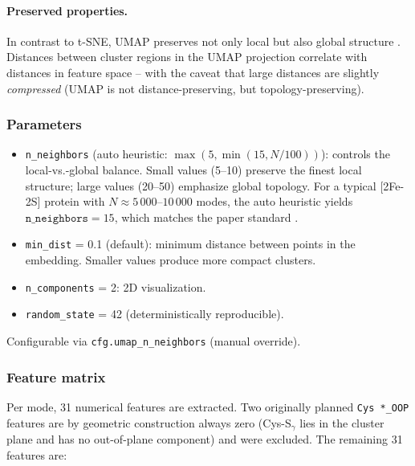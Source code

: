 \documentclass[11pt,a4paper,twoside]{article}
\theoremstyle{remark}
\begin{document}
\paragraph{Preserved properties.}

In contrast to t-SNE, UMAP preserves not only local but also global
structure \cite{Becht2019}. Distances between cluster regions in
the UMAP projection correlate with distances in feature space --
with the caveat that large distances are slightly \emph{compressed}
(UMAP is not distance-preserving, but topology-preserving).

\subsubsection*{Parameters}

\begin{itemize}
  \item \texttt{n\_neighbors} (auto heuristic:
        $\max(5, \min(15, N/100))$): controls the local-vs.-global
        balance. Small values (5--10) preserve the finest local
        structure; large values (20--50) emphasize global
        topology. For a typical [2Fe-2S] protein with
        $N \approx 5\,000$--$10\,000$ modes, the auto heuristic
        yields $\texttt{n\_neighbors} = 15$, which matches the
        paper standard \cite{McInnes2018}.

  \item \texttt{min\_dist} = 0.1 (default): minimum distance
        between points in the embedding. Smaller values produce
        more compact clusters.

  \item \texttt{n\_components} = 2: 2D visualization.

  \item \texttt{random\_state} = 42 (deterministically reproducible).
\end{itemize}

Configurable via \texttt{cfg.umap\_n\_neighbors} (manual override).

\subsubsection*{Feature matrix}
\label{sec:embedding-features}

Per mode, 31 numerical features are extracted. Two originally
planned \texttt{Cys *\_OOP} features are by geometric construction
always zero (Cys-S$_\gamma$ lies in the cluster plane and has no
out-of-plane component) and were excluded. The remaining 31
features are:
\end{document}

